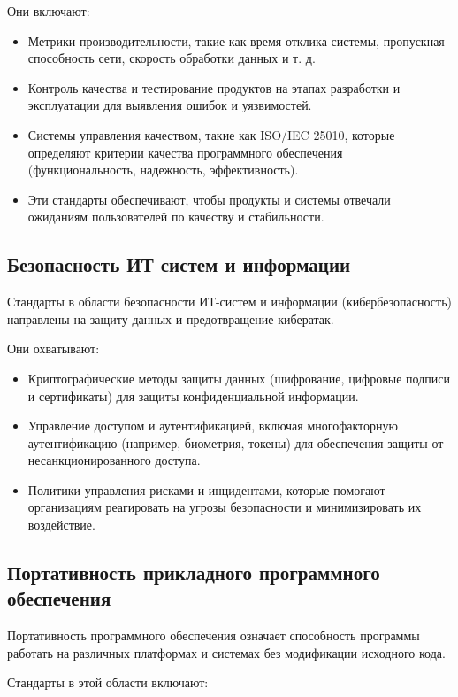 Они включают:

\begin{itemize}
	\item Метрики производительности, такие как время отклика системы,
		пропускная способность сети, скорость обработки данных и т. д.
	\item Контроль качества и тестирование продуктов на этапах разработки
		и эксплуатации для выявления ошибок и уязвимостей.
	\item Системы управления качеством, такие как ISO/IEC 25010,
		которые определяют критерии качества программного обеспечения
		(функциональность, надежность, эффективность).
	\item Эти стандарты обеспечивают, чтобы продукты
		и системы отвечали ожиданиям пользователей по качеству и стабильности.
\end{itemize}

\subsection{Безопасность ИТ систем и информации}

Стандарты в области безопасности ИТ-систем и информации (кибербезопасность)
направлены на защиту данных и предотвращение кибератак.

Они охватывают:

\begin{itemize}
	\item Криптографические методы защиты данных
		(шифрование, цифровые подписи и сертификаты)
		для защиты конфиденциальной информации.
	\item Управление доступом и аутентификацией,
		включая многофакторную аутентификацию (например, биометрия, токены)
		для обеспечения защиты от несанкционированного доступа.
	\item Политики управления рисками и инцидентами,
		которые помогают организациям реагировать на угрозы безопасности
		и минимизировать их воздействие.
\end{itemize}

\subsection{Портативность прикладного программного обеспечения}

Портативность программного обеспечения означает способность программы
работать на различных платформах и системах без модификации исходного кода.

Стандарты в этой области включают:

